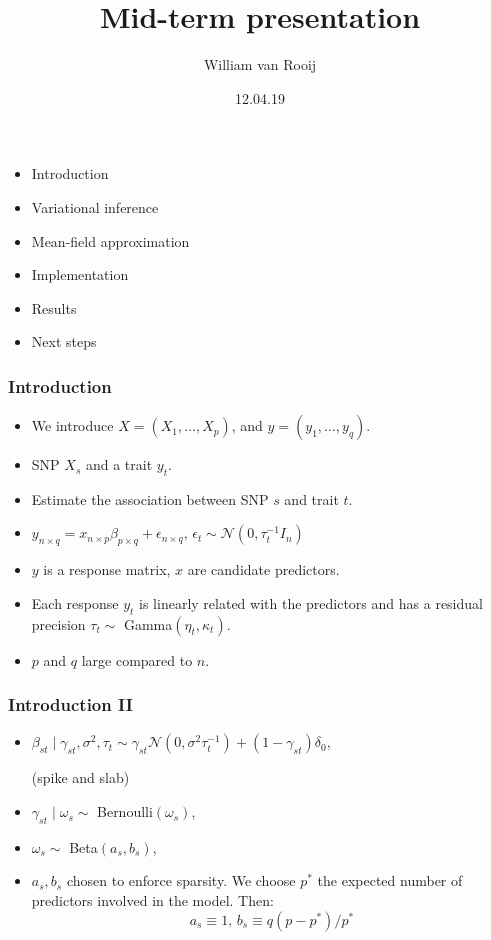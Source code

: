\documentclass{beamer}
\begin{document}
\title{Mid-term presentation}
\author{William van Rooij}
\date{12.04.19}
\maketitle
\begin{frame}
\begin{itemize}
\item Introduction
\item Variational inference
\item Mean-field approximation
\item Implementation
\item Results
\item Next steps
\end{itemize}
\end{frame}
\begin{frame}
\frametitle{Introduction}
\begin{itemize}
\item We introduce $X = (X_1,\ldots,X_p)$, and $y = (y_1,\ldots,y_q)$.
\item SNP $X_s$ and a trait $y_t$.
\item Estimate the association between SNP $s$ and trait $t$.
\item $y_{n\times q} = x_{n\times p}\beta_{p \times q} + \epsilon_{n\times q}\text{, }\epsilon_t \sim \mathcal{N}(0,\tau_t^{-1}I_n)$
\item $y$ is a response matrix, $x$ are candidate predictors.

\item Each response $y_t$ is linearly related with the predictors and has a residual precision $\tau_t \sim $ Gamma$(\eta_t, \kappa_t)$.

\item $p$ and $q$ large compared to $n$.
\end{itemize}
\end{frame}
\begin{frame}
\frametitle{Introduction II}
\begin{itemize}

\item $\beta_{st}\mid\gamma_{st},\sigma^2,\tau_t \sim \gamma_{st}\mathcal{N}(0,\sigma^2\tau_t^{-1})+(1-\gamma_{st})\delta_0$,

(spike and slab)

\item $\gamma_{st} \mid \omega_{s} \sim $ Bernoulli$(\omega_s)$,

\item $\omega_s \sim $ Beta$(a_s,b_s)$,
\item $a_s, b_s$ chosen to enforce sparsity. We choose $p^*$ the expected number of predictors involved in the model. Then:
$$
a_s \equiv 1\text{, }b_s \equiv q(p-p^*)/p^*
$$

\end{itemize}

\end{frame}
\end{document}
